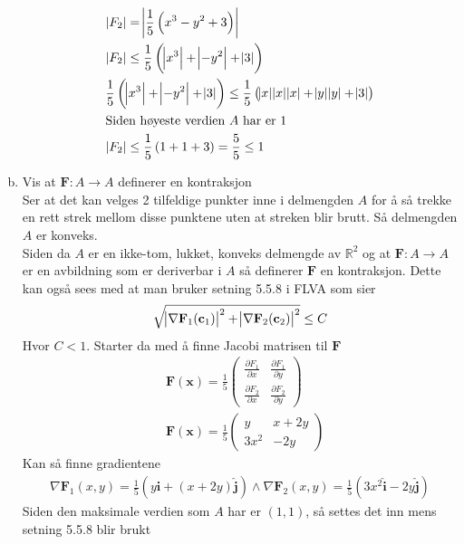 \documentclass[a4paper,10pt,english]{article}
\newcommand{\uvec}[1]{\boldsymbol{\hat{\textbf{#1}}}}
\begin{document}
\begin{enumerate}[a)]
\begin{align*}
				&\abs{F_2} = \abs{\frac{1}{5} \left( x^3 - y^2 + 3 \right)} \\
				&\abs{F_2} \leq \frac{1}{5} \left(  \abs{x^3} + \abs{-y^2} + \abs{3} \right)  \\
				&\frac{1}{5} \left(  \abs{x^3} + \abs{-y^2} + \abs{3} \right) \leq \frac{1}{5} \left( \abs{x} \abs{x} \abs{x} + \abs{y} \abs{y} + \abs{3} \right)\\
				&\text{Siden høyeste verdien $A$ har er $1$ }\\
				&\abs{F_2} \leq \frac{1}{5} \left( 1 + 1 + 3\right) = \frac{5}{5} \leq 1
			\end{align*}
		\item Vis at $\mathbf{F}: A \rightarrow A$ definerer en kontraksjon \\
			\newline
			Ser at det kan velges 2 tilfeldige punkter inne i delmengden $A$ for å så trekke en rett strek mellom disse punktene uten at streken blir brutt. Så delmengden $A$ er konveks.\\
			Siden da $A$ er en ikke-tom, lukket, konveks delmengde av $\mathbb{R}^2$ og at $\mathbf{F}: A \rightarrow A$ er en avbildning som er deriverbar i $A$ så definerer $\mathbf{F}$ en kontraksjon. Dette kan også sees med at man bruker setning 5.5.8 i FLVA som sier \[
				\sqrt{\abs{\nabla \mathbf{F}_1 (\mathbf{c}_1)}^2 + \abs{\nabla \mathbf{F}_2 (\mathbf{c}_2)}^2} \leq C
			\]
			Hvor $C < 1$. Starter da med å finne Jacobi matrisen til $\mathbf{F}$
			\begin{align*}
				&\mathbf{F}(\mathbf{x}) = \frac{1}{5}
				\begin{pmatrix}
					\frac{\partial F_1}{\partial x} & \frac{\partial F_1}{\partial y} \\
					\frac{\partial F_2}{\partial x} & \frac{\partial F_2}{\partial y} 
				\end{pmatrix}\\
				&\mathbf{F}(\mathbf{x}) = \frac{1}{5}
				\begin{pmatrix}
					y & x + 2y \\
					3x^2 & -2y
				\end{pmatrix}
			\end{align*}
			Kan så finne gradientene
			\begin{align*}
				\nabla \mathbf{F}_1 (x, y) = \frac{1}{5} \left( y \uvec{i} + (x + 2y) \uvec{j} \right) \wedge \nabla \mathbf{F}_2 (x, y) = \frac{1}{5} \left( 3x^2 \uvec{i} - 2y \uvec{j} \right) 
			\end{align*}
			Siden den maksimale verdien som  $A$ har er $(1, 1)$, så settes det inn mens setning 5.5.8 blir brukt

\end{enumerate}
\end{document}
